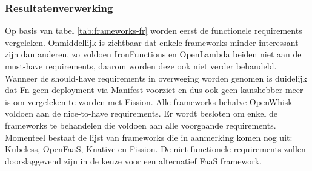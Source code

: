 \begin{table}[]
    \centering
    \caption{Vergelijking open source serverless frameworks op basis van niet-functionele requirements.}
    \label{tab:frameworks-nfr}
\end{table}

\subsubsection{Resultatenverwerking}
Op basis van tabel \ref{tab:frameworks-fr} worden eerst de functionele requirements vergeleken. Onmiddellijk is zichtbaar dat enkele frameworks minder interessant zijn dan anderen, zo voldoen IronFunctions en OpenLambda beiden niet aan de must-have requirements, daarom worden deze ook niet verder behandeld. Wanneer de should-have requirements in overweging worden genomen is duidelijk dat Fn geen deployment via Manifest voorziet en dus ook geen kanshebber meer is om vergeleken te worden met Fission. Alle frameworks behalve OpenWhisk voldoen aan de nice-to-have requirements. Er wordt besloten om enkel de frameworks te behandelen die voldoen aan alle voorgaande requirements. Momenteel bestaat de lijst van frameworks die in aanmerking komen nog uit: Kubeless, OpenFaaS, Knative en Fission. De niet-functionele requirements zullen doorslaggevend zijn in de keuze voor een alternatief FaaS framework.

